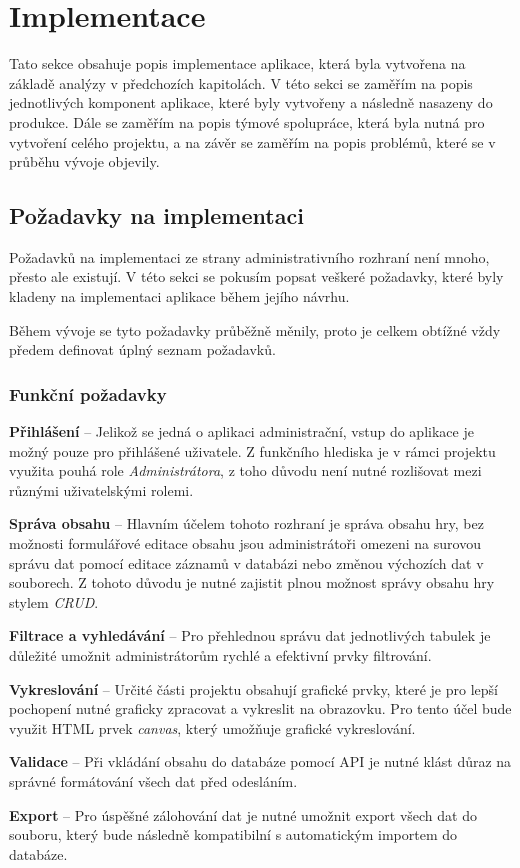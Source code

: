 \chapter{Implementace}
\label{ch:implementation}
Tato sekce obsahuje popis implementace aplikace, která byla vytvořena na základě analýzy v předchozích kapitolách. V této sekci se zaměřím na popis jednotlivých komponent aplikace, které byly vytvořeny a následně nasazeny do produkce. Dále se zaměřím na popis týmové spolupráce, která byla nutná pro vytvoření celého projektu, a na závěr se zaměřím na popis problémů, které se v průběhu vývoje objevily.

\section{Požadavky na implementaci}
\label{sec:implementation-requirements}
Požadavků na implementaci ze strany administrativního rozhraní není mnoho, přesto ale existují. V této sekci se pokusím popsat veškeré požadavky, které byly kladeny na implementaci aplikace během jejího návrhu.

Během vývoje se tyto požadavky průběžně měnily, proto je celkem obtížné vždy předem definovat úplný seznam požadavků.

\subsection*{Funkční požadavky}
\label{subsec:implementation-requirements-functional}

\begin{description}
    \item \textbf{Přihlášení} -- Jelikož se jedná o aplikaci administrační, vstup do aplikace je možný pouze pro přihlášené uživatele. Z funkčního hlediska je v rámci projektu využita pouhá role \textit{Administrátora}, z toho důvodu není nutné rozlišovat mezi různými uživatelskými rolemi.
    \item \textbf{Správa obsahu} -- Hlavním účelem tohoto rozhraní je správa obsahu hry, bez možnosti formulářové editace obsahu jsou administrátoři omezeni na surovou správu dat pomocí editace záznamů v databázi nebo změnou výchozích dat v souborech. Z tohoto důvodu je nutné zajistit plnou možnost správy obsahu hry stylem \textit{CRUD}.
    \item \textbf{Filtrace a vyhledávání} -- Pro přehlednou správu dat jednotlivých tabulek je důležité umožnit administrátorům rychlé a efektivní prvky filtrování.
    \item \textbf{Vykreslování} -- Určité části projektu obsahují grafické prvky, které je pro lepší pochopení nutné graficky zpracovat a vykreslit na obrazovku. Pro tento účel bude využit HTML prvek \textit{canvas}, který umožňuje grafické vykreslování.
    \item \textbf{Validace} -- Při vkládání obsahu do databáze pomocí API je nutné klást důraz na správné formátování všech dat před odesláním.
    \item \textbf{Export} -- Pro úspěšné zálohování dat je nutné umožnit export všech dat do souboru, který bude následně kompatibilní s automatickým importem do databáze.
\end{description}

